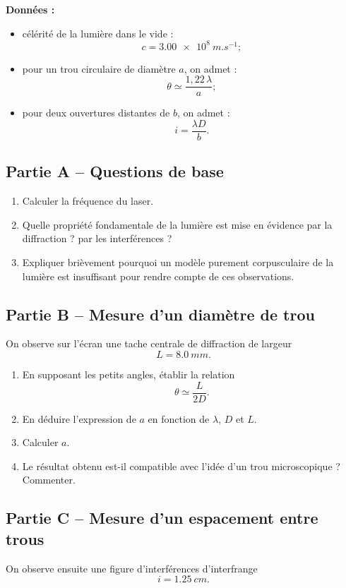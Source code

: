 \documentclass[11pt,a4paper]{article}
\begin{document}
\medskip

\noindent\textbf{Données :}
\begin{itemize}
    \item célérité de la lumière dans le vide :
    \[
    c=\SI{3,00e8}{m.s^{-1}};
    \]
    \item pour un trou circulaire de diamètre $a$, on admet :
    \[
    \theta \simeq \frac{1,22\,\lambda}{a};
    \]
    \item pour deux ouvertures distantes de $b$, on admet :
    \[
    i=\frac{\lambda D}{b}.
    \]
\end{itemize}

\subsection*{Partie A -- Questions de base}
\begin{enumerate}[label=\textbf{1.\arabic*}, leftmargin=1.6em]
    \item Calculer la fréquence du laser.
    \item Quelle propriété fondamentale de la lumière est mise en évidence par la diffraction ? par les interférences ?
    \item Expliquer brièvement pourquoi un modèle purement corpusculaire de la lumière est insuffisant pour rendre compte de ces observations.
\end{enumerate}

\subsection*{Partie B -- Mesure d’un diamètre de trou}
On observe sur l’écran une tache centrale de diffraction de largeur
\[
L=\SI{8,0}{mm}.
\]

\begin{enumerate}[label=\textbf{1.\arabic*}, resume, leftmargin=1.6em]
    \item En supposant les petits angles, établir la relation
    \[
    \theta \simeq \frac{L}{2D}.
    \]
    \item En déduire l’expression de $a$ en fonction de $\lambda$, $D$ et $L$.
    \item Calculer $a$.
    \item Le résultat obtenu est-il compatible avec l’idée d’un \og trou microscopique \fg{} ? Commenter.
\end{enumerate}

\subsection*{Partie C -- Mesure d’un espacement entre trous}
On observe ensuite une figure d’interférences d’interfrange
\[
i=\SI{1,25}{cm}.
\]
\end{document}
